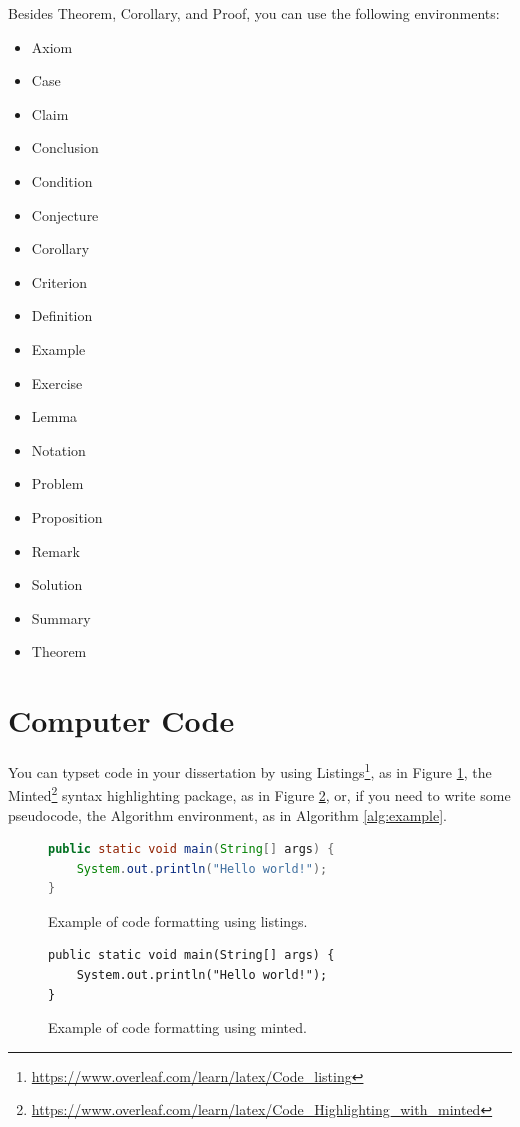 \documentclass[12pt,reqno,twoside]{amsbook}
\begin{document}
\noindent Besides Theorem, Corollary, and Proof, you can use the following environments:
\begin{itemize}
    \item Axiom
    \item Case
    \item Claim
    \item Conclusion
    \item Condition
    \item Conjecture
    \item Corollary
    \item Criterion
    \item Definition
    \item Example
    \item Exercise
    \item Lemma
    \item Notation
    \item Problem
    \item Proposition
    \item Remark
    \item Solution
    \item Summary
    \item Theorem
\end{itemize}

\section{Computer Code}

You can typset code in your dissertation by using Listings\footnote{\url{https://www.overleaf.com/learn/latex/Code_listing}}, as in Figure \ref{code:listings}, the Minted\footnote{\url{https://www.overleaf.com/learn/latex/Code_Highlighting_with_minted}} syntax highlighting package, as in Figure \ref{code:minted}, or, if you need to write some pseudocode, the Algorithm environment, as in Algorithm \ref{alg:example}.

\begin{figure}[h]
\begin{lstlisting}[language=Java]
public static void main(String[] args) {
    System.out.println("Hello world!");
}
\end{lstlisting}
\caption{Example of code formatting using listings.}\label{code:listings}
\end{figure}

\begin{figure}[h]
\begin{verbatim}
public static void main(String[] args) {
    System.out.println("Hello world!");
}
\end{verbatim}
\caption{Example of code formatting using minted.}\label{code:minted}
\end{figure}
\end{document}
